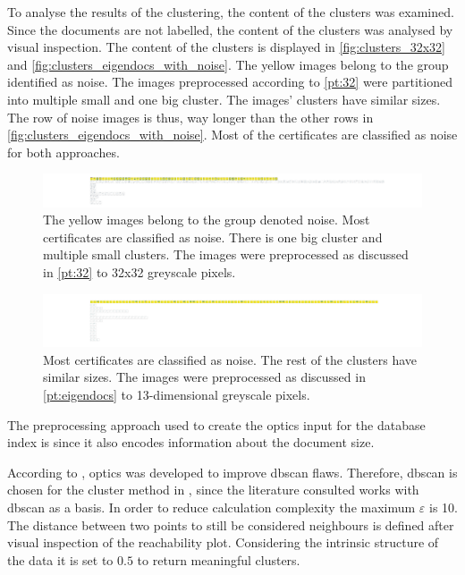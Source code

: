 To analyse the results of the clustering, the content of the clusters was examined.
Since the documents are not labelled, the content of the clusters was analysed by visual inspection.
The content of the clusters is displayed in \autoref{fig:clusters_32x32} and \autoref{fig:clusters_eigendocs_with_noise}.
The yellow images belong to the group identified as noise.
The images preprocessed according to \autoref{pt:32} were partitioned into multiple small and one big cluster.
The \eigendocs{} images' clusters have similar sizes. 
The row of noise images is thus, way longer than the other rows in \autoref{fig:clusters_eigendocs_with_noise}.
Most of the certificates are classified as noise for both approaches.


\begin{figure}[htp] %
    \centering
    \includegraphics[width=1.05\textwidth]{images/OPTICS/32x32/cluster_content_32x32.pdf}
    \caption[Detailed \ac{optics} clusters using 32x32 greyscale pixels]{The yellow images belong to the group denoted noise.
    Most certificates are classified as noise.
    There is one big cluster and multiple small clusters.
    The images were preprocessed as discussed in \autoref{pt:32} to 32x32 greyscale pixels.
    }
    \label{fig:clusters_32x32}
\end{figure}

\begin{figure}[htp] %
    \centering
    \includegraphics[width=1.05\textwidth]{images/OPTICS/eigendocs/cluster_content_incl_noise_Eigendocs.pdf}
    \caption[Detailed \ac{optics} clusters using \eigendocs{}]{Most certificates are classified as noise. The rest of the clusters have similar sizes.
    The images were preprocessed as discussed in \autoref{pt:eigendocs} to 13-dimensional greyscale pixels.
    }
    \label{fig:clusters_eigendocs_with_noise}
\end{figure}


The preprocessing approach used to create the \ac{optics} input for the \databaseName{} database index is \eigendocs{} since it also encodes information about the document size. 

According to \citeauthor{OPTICS2014}, \ac{optics} was developed to improve \ac{dbscan} flaws.
Therefore, \ac{dbscan} is chosen for the cluster method in , since the literature consulted works with \ac{dbscan} as a basis.
In order to reduce calculation complexity the maximum $\varepsilon$ is 10.
The distance between two points to still be considered neighbours is defined after visual inspection of the reachability plot.
Considering the intrinsic structure of the data it is set to $0.5$ to return meaningful clusters.